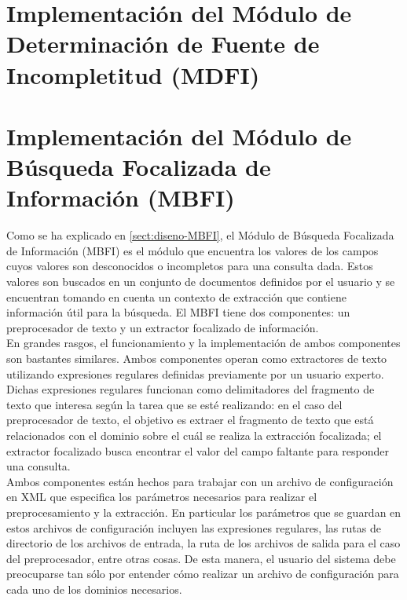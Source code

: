 \section{Implementación del Módulo de Determinación de Fuente de Incompletitud (MDFI)}\label{sect:implementacion-MDFI}

\section{Implementación del Módulo de Búsqueda Focalizada de Información (MBFI)}\label{sect:implementacion-MBFI}

Como se ha explicado en \ref{sect:diseno-MBFI}, el Módulo de Búsqueda Focalizada de Información (MBFI) es el módulo que encuentra los valores de los campos cuyos valores son desconocidos o incompletos para una consulta dada. Estos valores son buscados en un conjunto de documentos definidos por el usuario y se encuentran tomando en cuenta un contexto de extracción que contiene información útil para la búsqueda. El MBFI tiene dos componentes: un preprocesador de texto y un extractor focalizado de información. \\

En grandes rasgos, el funcionamiento y la implementación de ambos componentes son bastantes similares. Ambos componentes operan como extractores de texto utilizando expresiones regulares definidas previamente por un usuario experto. Dichas expresiones regulares funcionan como delimitadores del fragmento de texto que interesa según la tarea que se esté realizando: en el caso del preprocesador de texto, el objetivo es extraer el fragmento de texto que está relacionados con el dominio sobre el cuál se realiza la extracción focalizada; el extractor focalizado busca encontrar el valor del campo faltante para responder una consulta. \\

Ambos componentes están hechos para trabajar con un archivo de configuración en XML que especifica los parámetros necesarios para realizar el preprocesamiento y la extracción. En particular los parámetros que se guardan en estos archivos de configuración incluyen las expresiones regulares, las rutas de directorio de los archivos de entrada, la ruta de los archivos de salida para el caso del preprocesador, entre otras cosas. De esta manera, el usuario del sistema debe preocuparse tan sólo por entender cómo realizar un archivo de configuración para cada uno de los dominios necesarios. \\

